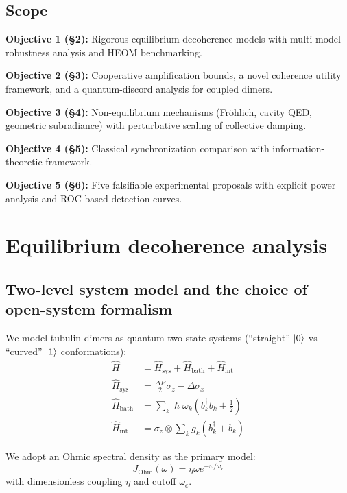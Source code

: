 \documentclass[twocolumn,10pt]{article}
\renewcommand{\hbar}{\hslash}
\begin{document}
\subsection{Scope}

\textbf{Objective 1 (\S 2):} Rigorous equilibrium decoherence models with
multi-model robustness analysis and HEOM benchmarking.

\textbf{Objective 2 (\S 3):} Cooperative amplification bounds, a novel
coherence utility framework, and a quantum-discord analysis for coupled
dimers.

\textbf{Objective 3 (\S 4):} Non-equilibrium mechanisms (Fr\"ohlich, cavity
QED, geometric subradiance) with perturbative scaling of collective damping.

\textbf{Objective 4 (\S 5):} Classical synchronization comparison with
information-theoretic framework.

\textbf{Objective 5 (\S 6):} Five falsifiable experimental proposals with
explicit power analysis and ROC-based detection curves.


\section{Equilibrium decoherence analysis}

\subsection{Two-level system model and the choice of open-system formalism}

We model tubulin dimers as quantum two-state systems (``straight'' $\ket{0}$
vs ``curved'' $\ket{1}$ conformations):
\begin{align}
\hat{H} &= \hat{H}_{\text{sys}} + \hat{H}_{\text{bath}} + \hat{H}_{\text{int}} \label{eq:H_total} \\
\hat{H}_{\text{sys}} &= \frac{\Delta E}{2}\sigma_z - \Delta \sigma_x \\
\hat{H}_{\text{bath}} &= \sum_k \hbar\omega_k (b_k^\dagger b_k + \tfrac{1}{2}) \\
\hat{H}_{\text{int}} &= \sigma_z \otimes \sum_k g_k (b_k^\dagger + b_k)
\end{align}

We adopt an Ohmic spectral density as the primary model:
\begin{equation}
J_{\text{Ohm}}(\omega) = \eta \omega e^{-\omega/\omega_c}
\label{eq:spectral_ohmic}
\end{equation}
with dimensionless coupling $\eta$ and cutoff $\omega_c$.
\end{document}
